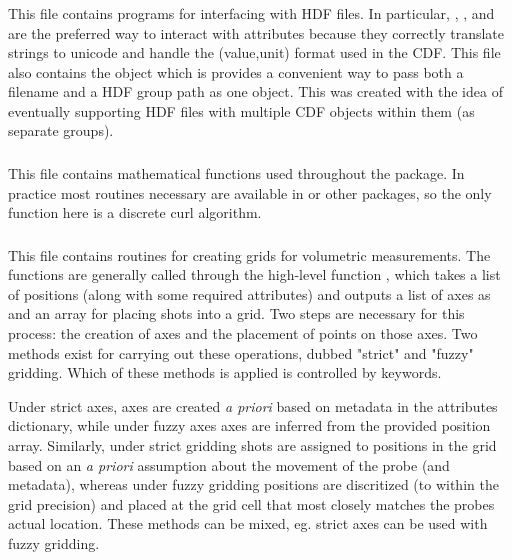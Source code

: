 \subsubsection{}

This file contains programs for interfacing with HDF files. In particular, , , and  are the preferred way to interact with attributes because they correctly translate strings to unicode and handle the (value,unit) format used in the CDF. This file also contains the  object which is provides a convenient way to pass both a filename and a HDF group path as one object. This was created with the idea of eventually supporting HDF files with multiple CDF objects within them (as separate groups).

\subsubsection{}

This file contains mathematical functions used throughout the package. In practice most routines necessary are available in  or other packages, so the only function here is a discrete curl algorithm.

\subsubsection{}

This file contains routines for creating grids for volumetric measurements. The functions are generally called through the high-level function , which takes a list of positions (along with some required attributes) and outputs a list of axes as and an array for placing shots into a grid. Two steps are necessary for this process: the creation of axes and the placement of points on those axes. Two methods exist for carrying out these operations, dubbed "strict" and "fuzzy" gridding. Which of these methods is applied is controlled by keywords.

Under strict axes, axes are created \textit{a priori} based on metadata in the attributes dictionary, while under fuzzy axes axes are inferred from the provided position array. Similarly, under strict gridding shots are assigned to positions in the grid based on an \textit{a priori} assumption about the movement of the probe (and metadata), whereas under fuzzy gridding positions are discritized (to within the grid precision) and placed at the grid cell that most closely matches the probes actual location. These methods can be mixed, eg. strict axes can be used with fuzzy gridding. 

